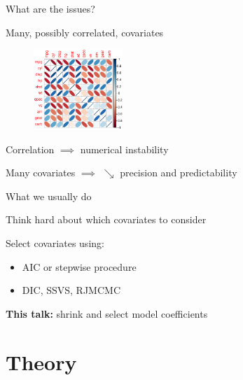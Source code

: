 \documentclass[14pt]{beamer}
\begin{document}
\begin{frame}[fragile]{What are the issues?}

Many, possibly correlated, covariates

{
  \begin{figure}
    \centering
    \includegraphics[width = 0.3\textwidth]{coor_matrix.eps}
  \end{figure}
}

Correlation $\implies$ numerical instability

Many covariates $\implies$ $\searrow$ precision and predictability

\end{frame}

\begin{frame}[fragile]{What we usually do}

Think hard about which covariates to consider

Select covariates using:
\begin{itemize}
\item AIC or stepwise procedure
\item DIC, SSVS, RJMCMC
\end{itemize}

\textbf{This talk:} shrink and select model coefficients

\end{frame}

\section{Theory}
\end{document}

